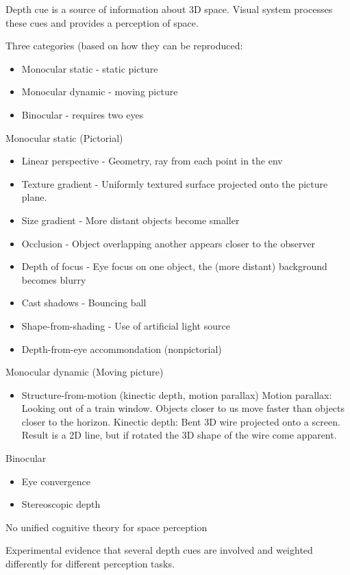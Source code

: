 \documentclass[a4paper]{article}
\begin{document}
Depth cue is a source of information about 3D space. Visual system processes these cues and provides a perception of space. 

Three categories (based on how they can be reproduced:
\begin{itemize}
  \item Monocular static - static picture
  \item Monocular dynamic - moving picture
  \item Binocular - requires two eyes
\end{itemize}

Monocular static (Pictorial)
\begin{itemize}
  \item Linear perspective - Geometry, ray from each point in the env
  \item Texture gradient - Uniformly textured surface projected onto the picture plane.
  \item Size gradient - More distant objects become smaller
  \item Occlusion - Object overlapping another appears closer to the observer
  \item Depth of focus - Eye focus on one object, the (more distant) background becomes blurry
  \item Cast shadows - Bouncing ball
  \item Shape-from-shading - Use of artificial light source
  \item Depth-from-eye accommondation (nonpictorial) 
\end{itemize}

Monocular dynamic (Moving picture)
\begin{itemize}
  \item Structure-from-motion (kinectic depth, motion parallax)
  Motion parallax: Looking out of a train window. Objects closer to us move faster than objects closer to the horizon. 
  Kinectic depth: Bent 3D wire projected onto a screen. Result is a 2D line, but if rotated the 3D shape of the wire come apparent.
\end{itemize}

Binocular
\begin{itemize}
  \item Eye convergence
  \item Stereoscopic depth
\end{itemize}

No unified cognitive theory for space perception

Experimental evidence that several depth cues are involved and weighted differently for different perception tasks.
\end{document}
